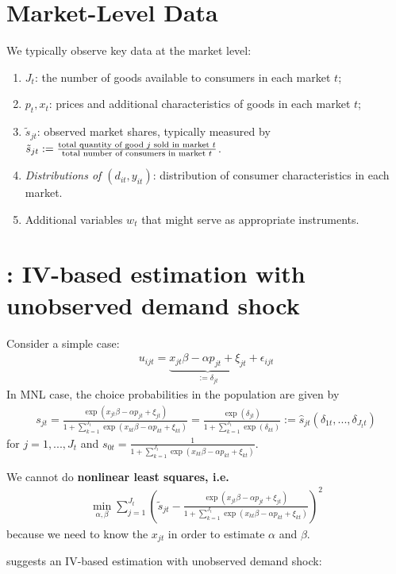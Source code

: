 \documentclass[11pt]{elegantbook}
\begin{document}
\section{Market-Level Data}
We typically observe key data at the market level:
\begin{enumerate}
    \item $J_t$: the number of goods available to consumers in each market $t$;
    \item $p_t,x_t$: prices and additional characteristics of goods in each market $t$;
    \item $\tilde{s}_{jt}$: observed market shares, typically measured by $\tilde{s}_{jt}:=\frac{\textnormal{total quantity of good $j$ sold in market $t$}}{\textnormal{total number of consumers in market $t$}}$.
    \item \textit{Distributions of $(d_{it},y_{it})$}: distribution of consumer characteristics in each market.
    \item Additional variables $w_t$ that might serve as appropriate instruments.
\end{enumerate}



\section{\cite{berry1994estimating}: IV-based estimation with unobserved demand shock}
Consider a simple case:
\begin{equation}
    \begin{aligned}
        u_{ijt}=\underbrace{x_{jt}\beta-\alpha p_{jt}+\xi_{jt}}_{:=\delta_{jt}}+\epsilon_{ijt}
    \end{aligned}
    \nonumber
\end{equation}
In MNL case, the choice probabilities in the population are given by
\begin{equation}
    \begin{aligned}
        s_{jt}=\frac{\exp(x_{jt}\beta-\alpha p_{jt}+\xi_{jt})}{1+\sum_{k=1}^{J_t}\exp(x_{kt}\beta-\alpha p_{kt}+\xi_{kt})}=\frac{\exp(\delta_{jt})}{1+\sum_{k=1}^{J_t}\exp(\delta_{kt})}:=\hat{s}_{jt}(\delta_{1t},...,\delta_{J_tt})
    \end{aligned}
    \label{eq:s_jt}
\end{equation}
for $j=1,...,J_t$ and $s_{0t}=\frac{1}{1+\sum_{k=1}^{J_t}\exp(x_{kt}\beta-\alpha p_{kt}+\xi_{kt})}$.

\begin{note}
    We cannot do \textbf{nonlinear least squares, i.e.}
    \begin{equation}
        \begin{aligned}
            \min_{\alpha,\beta} \sum_{j=1}^{J_t}\left(\tilde{s}_{jt}-\frac{\exp(x_{jt}\beta-\alpha p_{jt}+\xi_{jt})}{1+\sum_{k=1}^{J_t}\exp(x_{kt}\beta-\alpha p_{kt}+\xi_{kt})}\right)^2
        \end{aligned}
        \nonumber
    \end{equation}
    because we need to know the $x_{jt}$ in order to estimate $\alpha$ and $\beta$.
\end{note}
\cite{berry1994estimating} suggests an IV-based estimation with unobserved demand shock:
\end{document}
